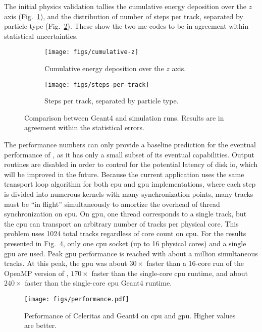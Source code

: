The initial physics validation tallies the cumulative energy deposition over the
$z$ axis (Fig.~\ref{fig:physics-results:edep}), and the distribution of number
of steps per track, separated by particle type
(Fig.~\ref{fig:physics-results:steps}). These show the two \ac{mc} codes to be
in agreement within statistical uncertainties.
\begin{figure}
  \centering%
  \begin{subfigure}{\textwidth/2}%
    \texttt{[image: figs/cumulative-z]}%
    \caption{Cumulative energy deposition over the $z$ axis.}%
    \label{fig:physics-results:edep}
  \end{subfigure}%
  \begin{subfigure}{\textwidth/2}%
    \texttt{[image: figs/steps-per-track]}%
    \caption{Steps per track, separated by particle type.}%
    \label{fig:physics-results:steps}
  \end{subfigure}
  \caption{Comparison between Geant4 and \celeritas simulation runs. Results are
  in agreement within the statistical errors.}
  \label{fig:physics-results}
\end{figure}
The performance numbers can only provide a baseline prediction for the eventual
performance of \celeritas, as it has only a small subset of its eventual
capabilities. Output routines are disabled in order to control for the potential
latency of disk \ac{io}, which will be improved in the future. Because the
current \celeritas application uses the same transport loop algorithm for both
\ac{cpu} and \ac{gpu} implementations, where each step is divided into numerous
kernels with many synchronization points, many tracks must be ``in flight''
simultaneously to amortize the overhead of thread synchronization on \ac{cpu}.
On \ac{gpu}, one thread corresponds to a single track, but the \ac{cpu} can
transport an arbitrary number of tracks per physical core. This problem uses
\num{1024} total tracks regardless of core count on \ac{cpu}. For the results
presented in Fig.~\ref{fig:celeritas-performance}, only one \ac{cpu} socket (up
to 16 physical cores) and a single \ac{gpu} are used. Peak \ac{gpu} performance
is reached with about a million simultaneous tracks. At this peak, the \ac{gpu}
was about $30 \times$ faster than a 16-core run of the OpenMP version of
\celeritas,  $170 \times$ faster than the single-core \ac{cpu} \celeritas
runtime, and about $240 \times$ faster than the single-core \ac{cpu} Geant4
runtime.

\begin{figure}
    \centering
    \texttt{[image: figs/performance.pdf]}
    \caption{Performance of Celeritas and Geant4 on \acs{cpu} and \acs{gpu}.
    Higher values are better.}
    \label{fig:celeritas-performance}
\end{figure}

